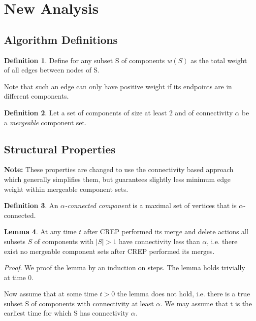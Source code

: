 \documentclass[a4paper,xcolor=dvipsnames, tikz, 12pt]{article}
\newcommand{\crep}{C{\scriptsize REP}}
\theoremstyle{definition}
\newtheorem{defi}{Definition}
\newtheorem{lemma}[defi]{Lemma}
\begin{document}
	

\section{New Analysis}
\label{analysisSection}

\subsection{Algorithm Definitions}

\begin{defi}
	Define for any subset S of components $w(S)$ as the total weight of all edges between nodes of S.
\end{defi}

Note that such an edge can only have positive weight if its endpoints are in different components.

\begin{defi}
	Let a set of components of size at least 2 and of connectivity $\alpha$ be a \textit{mergeable} component set.	
\end{defi}


\subsection{Structural Properties}


\textbf{Note:} These properties are changed to use the connectivity based approach which generally simplifies them, but guarantees slightly less minimum edge weight within mergeable component sets.
\begin{defi}
	An $\alpha$\textit{-connected component} is a maximal set of vertices that is $\alpha$-connected.
\end{defi}

\begin{lemma}
	At any time $t$ after \crep{} performed its merge and delete actions all subsets $S$ of components with $|S|>1$ have connectivity less than $\alpha$, i.e. there exist no mergeable component sets after \crep{} performed its merges.
\end{lemma}

\textit{Proof.} We proof the lemma by an induction on steps. The lemma holds trivially at time 0.

Now assume that at some time $t>0$ the lemma does not hold, i.e. there is a true subset S of components with connectivity at least $\alpha$. We may assume that t is the earliest time for which S has connectivity $\alpha$.
\end{document}
